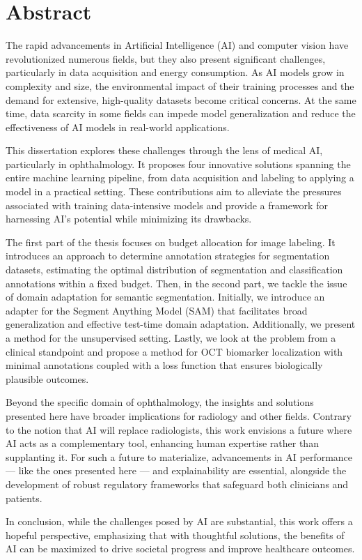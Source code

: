 \chapter*{Abstract}
The rapid advancements in Artificial Intelligence (AI) and computer vision have revolutionized numerous fields, but they also present significant challenges, particularly in data acquisition and energy consumption. As AI models grow in complexity and size, the environmental impact of their training processes and the demand for extensive, high-quality datasets become critical concerns. At the same time, data scarcity in some fields can impede model generalization and reduce the effectiveness of AI models in real-world applications.

This dissertation explores these challenges through the lens of medical AI, particularly in ophthalmology. It proposes four innovative solutions spanning the entire machine learning pipeline, from data acquisition and labeling to applying a model in a practical setting. These contributions aim to alleviate the pressures associated with training data-intensive models and provide a framework for harnessing AI's potential while minimizing its drawbacks.

The first part of the thesis focuses on budget allocation for image labeling. It introduces an approach to determine annotation strategies for segmentation datasets, estimating the optimal distribution of segmentation and classification annotations within a fixed budget. Then, in the second part, we tackle the issue of domain adaptation for semantic segmentation. Initially, we introduce an adapter for the Segment Anything Model (SAM) that facilitates broad generalization and effective test-time domain adaptation. Additionally, we present a method for the unsupervised setting. Lastly, we look at the problem from a clinical standpoint and propose a method for OCT biomarker localization with minimal annotations coupled with a loss function that ensures biologically plausible outcomes.

Beyond the specific domain of ophthalmology, the insights and solutions presented here have broader implications for radiology and other fields. Contrary to the notion that AI will replace radiologists, this work envisions a future where AI acts as a complementary tool, enhancing human expertise rather than supplanting it. For such a future to materialize, advancements in AI performance --- like the ones presented here --- and explainability are essential, alongside the development of robust regulatory frameworks that safeguard both clinicians and patients.

In conclusion, while the challenges posed by AI are substantial, this work offers a hopeful perspective, emphasizing that with thoughtful solutions, the benefits of AI can be maximized to drive societal progress and improve healthcare outcomes.

